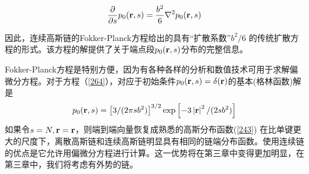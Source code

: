 \begin{equation}\label{264}
\frac{\partial}{\partial s}p_0(\mathbf{r} ,s)=\frac{b^2}{6}\nabla ^2 p_0(\mathbf{r} ,s) 
\end{equation}

因此，连续高斯链的Fokker-Planck方程给出的具有“扩散系数”$b^2/6$
的传统扩散方程的形式。该方程的解提供了关于端点段$p_0(\mathbf{r} ,s)$分布的完整信息。

Fokker-Planck方程是特别方便，因为有各种各样的分析和数值技术可用于求解偏微分方程。对于方程（\ref{264}），对应于初始条件$p_0(\mathbf{r} ,s)=\delta(\mathbf{r} )$的基本(格林函数)解是
\begin{equation}\label{265}
p_0(\mathbf{r} ,s)=\left[ 3/(2 \pi sb^2) \right]^{3/2}\exp \left[ -3\left| \mathbf{r}  \right|^2/(2sb^2) \right]
\end{equation}
如果令$s=N,\mathbf{r} =\mathbf{r} $，则端到端向量恢复成熟悉的高斯分布函数(\ref{243})
在比单键更大的尺度下，离散高斯链和连续高斯链明显具有相同的链端分布函数。使用连续链的优点是它允许用偏微分方程进行计算。这一优势将在第三章中变得更加明显，在第三章中，我们将考虑有外势的链。
\endinput
